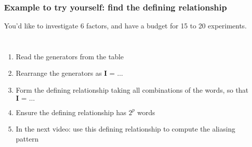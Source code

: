 \begin{frame}\frametitle{Example to try yourself: find the defining relationship}
	
	\vspace{0.5cm}
	You'd like to investigate 6 factors, and have a budget for 15 to 20 experiments.
	
	\vspace{0.5cm}
	\begin{columns}[T]
			\begin{enumerate}
				\item	Read the generators from the table 
				\item	Rearrange the generators as  $\textbf{I = \ldots}$
			 	\item	Form the {\color{purple}defining relationship} taking all combinations of the words, so that $\textbf{I = \ldots}$
			 	\item	Ensure the defining relationship has $2^p$ words
				\item	In the next video: use this defining relationship to compute the aliasing pattern
			\end{enumerate}
			

	\end{columns}

	
\end{frame}

